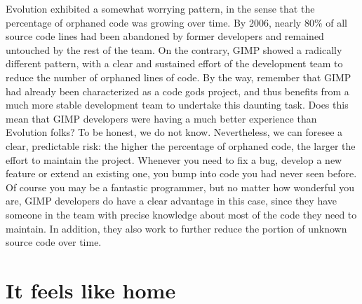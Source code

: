 Evolution exhibited a somewhat worrying pattern, in the sense that the percentage of orphaned code was growing over time. By 2006, nearly 80\% of all source code lines had been abandoned by former developers and remained untouched by the rest of the team. On the contrary, GIMP showed a radically different pattern, with a clear and sustained effort of the development team to reduce the number of orphaned lines of code. By the way, remember that GIMP had already been characterized  as a code gods project, and thus benefits from a much more stable development team to undertake this daunting task.
Does this mean that GIMP developers were having a much better experience than Evolution folks? To be honest, we do not know. Nevertheless, we can foresee a clear, predictable risk: the higher the percentage of orphaned code, the larger the effort to maintain the project. Whenever you need to fix a bug, develop a new feature or extend an existing one, you bump into code you had never seen before. Of course you may be a fantastic programmer, but no matter how wonderful you are, GIMP developers do have a clear advantage in this case, since they have someone in the team with precise knowledge about most of the code they need to maintain. In addition, they also work to further reduce the portion of unknown source code over time.

\section*{It feels like home}

